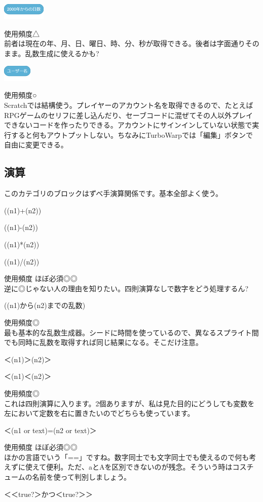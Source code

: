 \documentclass[b5paper,10pt]{jsarticle}
\begin{document}
\begin{multicols*}{3}
\begin{itembox}{12}
\includegraphics[height=8mm]{images/sensing_17.png}
\end{itembox}
使用頻度△\\
前者は現在の年、月、日、曜日、時、分、秒が取得できる。後者は字面通りそのまま。乱数生成に使えるかも?
\begin{itembox}{13}
\includegraphics[height=8mm]{images/sensing_18.png}
\end{itembox}
使用頻度○\\
Scratchでは結構使う。プレイヤーのアカウント名を取得できるので、たとえばRPGゲームのセリフに差し込んだり、セーブコードに混ぜてその人以外プレイできないコードを作ったりできる。アカウントにサインインしていない状態で実行すると何もアウトプットしない。ちなみにTurboWarpでは「編集」ボタンで自由に変更できる。

\subsection{演算}
このカテゴリのブロックはずべ手演算関係です。基本全部よく使う。
\begin{itembox}{1}
((n1)+(n2))

((n1)-(n2))

((n1)*(n2))

((n1)/(n2))
\end{itembox}
使用頻度 ほぼ必須◎◎\\
逆に◎じゃない人の理由を知りたい。四則演算なしで数字をどう処理するん?
\begin{itembox}{2}
((n1)から(n2)までの乱数)
\end{itembox}
使用頻度◎\\
最も基本的な乱数生成器。シードに時間を使っているので、異なるスプライト間でも同時に乱数を取得すれば同じ結果になる。そこだけ注意。
\begin{itembox}{3}
＜(n1)＞(n2)＞

＜(n1)＜(n2)＞
\end{itembox}
使用頻度◎\\
これは四則演算に入ります。2個ありますが、私は見た目的にどうしても変数を左において定数を右に置きたいのでどちらも使っています。
\begin{itembox}{4}
＜(n1 or text)=(n2 or text)＞
\end{itembox}
使用頻度 ほぼ必須◎◎\\
ほかの言語でいう「==」ですね。数字同士でも文字同士でも使えるので何も考えずに使えて便利。ただ、aとAを区別できないのが残念。そういう時はコスチュームの名前を使って判別しましょう。
\begin{itembox}{5}
＜＜true?＞かつ＜true?＞＞


\end{itembox}
\end{multicols*}
\end{document}
